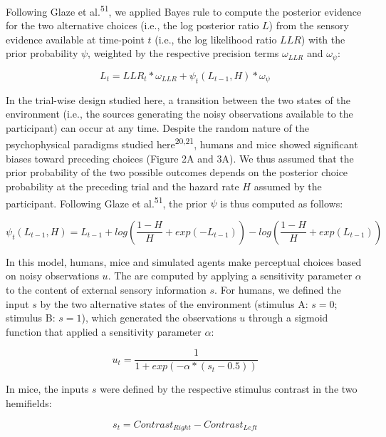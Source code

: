 \documentclass[
]{article}
\begin{document}
Following Glaze et al.\textsuperscript{51}, we applied Bayes rule to
compute the posterior evidence for the two alternative choices (i.e.,
the log posterior ratio \(L\)) from the sensory evidence available at
time-point \(t\) (i.e., the log likelihood ratio \(LLR\)) with the prior
probability \(\psi\), weighted by the respective precision terms
\(\omega_{LLR}\) and \(\omega_{\psi}\):

\begin{equation}
L_t = LLR_t * \omega_{LLR} + \psi_t(L_{t-1}, H) * \omega_{\psi}
\end{equation}

In the trial-wise design studied here, a transition between the two
states of the environment (i.e., the sources generating the noisy
observations available to the participant) can occur at any time.
Despite the random nature of the psychophysical paradigms studied
here\textsuperscript{20,21}, humans and mice showed significant biases
toward preceding choices (Figure 2A and 3A). We thus assumed that the
prior probability of the two possible outcomes depends on the posterior
choice probability at the preceding trial and the hazard rate \(H\)
assumed by the participant. Following Glaze et al.\textsuperscript{51},
the prior \(\psi\) is thus computed as follows:

\begin{equation}
\psi_t(L_{t-1}, H)  = L_{t-1} + log(\frac{1-H}{H} + exp(-L_{t-1})) - log(\frac{1-H}{H} + exp(L_{t-1}))
\end{equation}

In this model, humans, mice and simulated agents make perceptual choices
based on noisy observations \(u\). The are computed by applying a
sensitivity parameter \(\alpha\) to the content of external sensory
information \(s\). For humans, we defined the input \(s\) by the two
alternative states of the environment (stimulus A: \(s = 0\); stimulus
B: \(s = 1\)), which generated the observations \(u\) through a sigmoid
function that applied a sensitivity parameter \(\alpha\):

\begin{equation}
u_t = \frac{1}{1+exp(-\alpha*(s_t-0.5))}
\end{equation}

In mice, the inputs \(s\) were defined by the respective stimulus
contrast in the two hemifields:

\begin{equation}
s_t = Contrast_{Right} - Contrast_{Left}
\end{equation}
\end{document}
